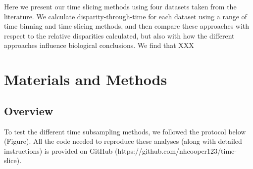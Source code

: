 \documentclass[12pt,a4paper]{article}
\begin{document}
Here we present our time slicing methods using four datasets taken from the literature.
We calculate disparity-through-time for each dataset using a range of time binning and time slicing methods, and then compare these approaches with respect to the relative disparities calculated, but also with how the different approaches influence biological conclusions. We find that XXX

\section{Materials and Methods}
\subsection{Overview}
\label{overview-section}
To test the different time subsampling methods, we followed the protocol below (Figure). 
All the code needed to reproduce these analyses (along with detailed instructions) is provided on GitHub (https://github.com/nhcooper123/time-slice). %

\end{document}
